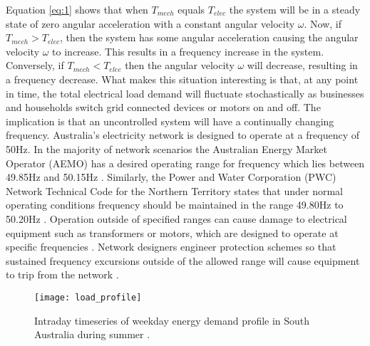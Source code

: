 Equation \ref{eq:1} shows that when $T_{mech}$ equals $T_{elec}$ the system will be in a steady state of zero angular acceleration with a constant angular velocity $\omega$. Now, if $T_{mech} > T_{elec}$, then the system has some angular acceleration causing the angular velocity $\omega$ to increase. This results in a frequency increase in the system. Conversely, if $T_{mech} < T_{elec}$ then the angular velocity $\omega$ will decrease, resulting in a frequency decrease. What makes this situation interesting is that, at any point in time, the total electrical load demand will fluctuate stochastically as businesses and households switch grid connected devices or motors on and off. The implication is that an uncontrolled system will have a continually changing frequency. Australia's electricity network is designed to operate at a frequency of 50$\si{\hertz}$. In the majority of network scenarios the Australian Energy Market Operator (AEMO) has a desired operating range for frequency which lies between 49.85$\si{\hertz}$ and 50.15$\si{\hertz}$ \cite{AEMOfreqdev}. Similarly, the Power and Water Corporation (PWC) Network Technical Code for the Northern Territory states that under normal operating conditions frequency should be maintained in the range 49.80$\si{\hertz}$ to 50.20$\si{\hertz}$ \cite{Pwc2013}. Operation outside of specified ranges can cause damage to electrical equipment such as transformers or motors, which are designed to operate at specific frequencies \cite{Sen2014}. Network designers engineer protection schemes so that sustained frequency excursions outside of the allowed range will cause equipment to trip from the network \cite{AEMOpowerfreqriskrev}.

\begin{figure}[ht]
	\centering
	\texttt{[image: load\_profile]}
	\caption{Intraday timeseries of weekday energy demand profile in South Australia during summer \cite{Aemosaenergyrep}.}
	\label{fig:energydemand}
\end{figure}

\newpage

